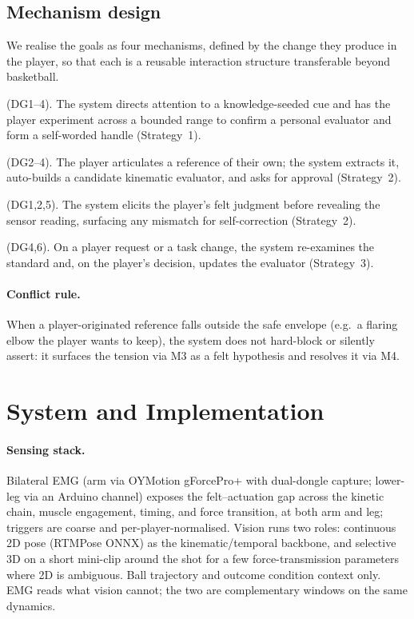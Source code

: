 \documentclass[sigconf]{acmart}
\begin{document}
\subsection{Mechanism design}
We realise the goals as four mechanisms, defined by the change they produce in the player, so that each is a reusable interaction structure transferable beyond basketball.

\begin{description}[leftmargin=1.2em]
  \item[M1 Guided Exploration] (DG1--4). The system directs attention to a knowledge-seeded cue and has the player experiment across a bounded range to confirm a personal evaluator and form a self-worded handle (Strategy~1).
  \item[M2 Articulation Grounding] (DG2--4). The player articulates a reference of their own; the system extracts it, auto-builds a candidate kinematic evaluator, and asks for approval (Strategy~2).
  \item[M3 Predict-Then-Reveal Calibration] (DG1,2,5). The system elicits the player's felt judgment before revealing the sensor reading, surfacing any mismatch for self-correction (Strategy~2).
  \item[M4 Reference Revision] (DG4,6). On a player request or a task change, the system re-examines the standard and, on the player's decision, updates the evaluator (Strategy~3).
\end{description}

\paragraph{Conflict rule.} When a player-originated reference falls outside the safe envelope (e.g.\ a flaring elbow the player wants to keep), the system does not hard-block or silently assert: it surfaces the tension via M3 as a felt hypothesis and resolves it via M4.

\section{System and Implementation}

\paragraph{Sensing stack.} Bilateral EMG (arm via OYMotion gForcePro+ with dual-dongle capture; lower-leg via an Arduino channel) exposes the felt--actuation gap across the kinetic chain, muscle engagement, timing, and force transition, at both arm and leg; triggers are coarse and per-player-normalised. Vision runs two roles: continuous 2D pose (RTMPose ONNX) as the kinematic/temporal backbone, and selective 3D on a short mini-clip around the shot for a few force-transmission parameters where 2D is ambiguous. Ball trajectory and outcome condition context only. EMG reads what vision cannot; the two are complementary windows on the same dynamics.
\end{document}
